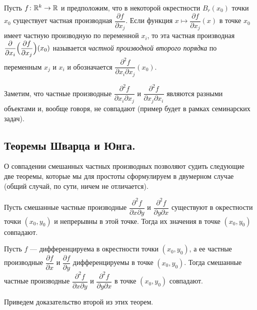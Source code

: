 \documentclass[a4paper]{article}
\theoremstyle{named}
\begin{document}
    \begin{definition*}
        Пусть $f\colon \mathbb{R}^k\to \mathbb{R}$ и предположим, что в некоторой окрестности $B_r(x_0)$ точки $x_0$ существует частная производная $\dfrac{\partial f}{\partial x_j}$. Если функция $x\mapsto \dfrac{\partial f}{\partial x_j}(x)$ в точке $x_0$ имеет частную производную по переменной $x_i$, то эта частная производная $\dfrac{\partial}{\partial x_i}\Bigl(\dfrac{\partial f}{\partial x_j}\Bigr) (x_0)$ называется {\it частной производной второго порядка} по переменным $x_j$ и $x_i$
        и обозначается $\dfrac{\partial^2 f}{\partial x_i\partial x_j}(x_0)$.
    \end{definition*}

    \begin{remark*}
        Заметим, что частные производные $\dfrac{\partial^2 f}{\partial x_i\partial x_j}$ и $\dfrac{\partial^2 f}{\partial x_j\partial x_i}$ являются разными объектами и, вообще говоря, не совпадают (пример будет в рамках семинарских задач).
    \end{remark*}

    \subsection{Теоремы Шварца и Юнга.}

    О совпадении смешанных частных производных позволяют судить следующие две теоремы, которые мы для простоты сформулируем в двумерном случае (общий случай, по сути, ничем не отличается).

    \begin{theorem}[Шварц]
        Пусть смешанные частные производные $\dfrac{\partial^2f}{\partial x\partial y}$ и $\dfrac{\partial^2f}{\partial y\partial x}$ существуют в окрестности точки $(x_0,y_0)$ и непрерывны в этой точке. Тогда их значения в точке $(x_0,y_0)$ совпадают.
    \end{theorem}

    \begin{theorem}[Юнг] Пусть $f$ --- дифференцируема в окрестности точки $(x_0,y_0)$,
    а ее частные производные $\dfrac{\partial f}{\partial x}$ и $\dfrac{\partial f}{\partial y}$
    дифференцируемы в точке $(x_0,y_0)$.
    Тогда смешанные частные производные $\dfrac{\partial^2f}{\partial x\partial y}$
    и $\dfrac{\partial^2f}{\partial y\partial x}$
    в точке $(x_0,y_0)$ совпадают.
    \end{theorem}

    Приведем доказательство второй из этих теорем.
\end{document}
